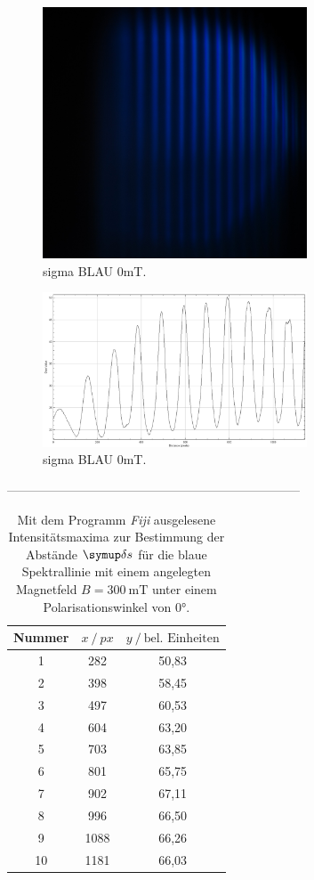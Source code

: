 \begin{figure}
  \centering
  \includegraphics[width=0.7\textwidth]{bilder/3000_BLAU_0mT_sigma.jpg}
  \caption{sigma BLAU 0mT.}
  \label{abb:sigmablau0mT}
\end{figure}
\begin{figure}
  \centering
  \includegraphics[width=0.7\textwidth]{bilder/sigmaBLAU_0mT.PNG}
  \caption{sigma BLAU 0mT.}
  \label{abb:plotsigmablau0mT}
\end{figure}
-----------------------------------------------------------------------

\begin{table}[H]
  \centering
  \caption{Mit dem Programm \textit{Fiji} \cite{Fiji} ausgelesene Intensitätsmaxima zur Bestimmung der Abstände $\deltaup s$ für die blaue Spektrallinie mit einem angelegten Magnetfeld $B=\SI{300}{\milli\tesla}$  unter einem Polarisationswinkel von $0°$.}
  \label{tab:277-Max}
  \begin{tabular}{c|cc}
    \toprule
    {Nummer} & {$x \:/\: \si{px}$} & {$y \:/\: \text{bel. Einheiten}$}\\
    \midrule
 1 &  282  &	 50,83 \\
 2 &  398  &	 58,45 \\
 3 &  497  &	 60,53 \\
 4 &  604  &	 63,20 \\
 5 &  703  &	 63,85 \\
 6 &  801  &	 65,75 \\
 7 &  902  &	 67,11 \\
 8 &  996  &	 66,50 \\
 9 &  1088 &   66,26 \\
10 &  1181 &	 66,03 \\
  \end{tabular}
\end{table}

